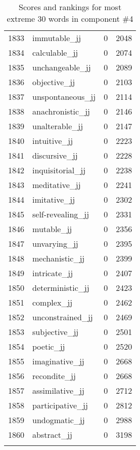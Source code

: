 \begin{longtable}[!htbp]{| rlr@{.}l |}
    1833 & immutable\_jj & 0 & 2048 \\
    1834 & calculable\_jj & 0 & 2074 \\
    1835 & unchangeable\_jj & 0 & 2089 \\
    1836 & objective\_jj & 0 & 2103 \\
    1837 & unspontaneous\_jj & 0 & 2114 \\
    1838 & anachronistic\_jj & 0 & 2146 \\
    1839 & unalterable\_jj & 0 & 2147 \\
    1840 & intuitive\_jj & 0 & 2223 \\
    1841 & discursive\_jj & 0 & 2228 \\
    1842 & inquisitorial\_jj & 0 & 2238 \\
    1843 & meditative\_jj & 0 & 2241 \\
    1844 & imitative\_jj & 0 & 2302 \\
    1845 & self-revealing\_jj & 0 & 2331 \\
    1846 & mutable\_jj & 0 & 2356 \\
    1847 & unvarying\_jj & 0 & 2395 \\
    1848 & mechanistic\_jj & 0 & 2399 \\
    1849 & intricate\_jj & 0 & 2407 \\
    1850 & deterministic\_jj & 0 & 2423 \\
    1851 & complex\_jj & 0 & 2462 \\
    1852 & unconstrained\_jj & 0 & 2469 \\
    1853 & subjective\_jj & 0 & 2501 \\
    1854 & poetic\_jj & 0 & 2520 \\
    1855 & imaginative\_jj & 0 & 2668 \\
    1856 & recondite\_jj & 0 & 2668 \\
    1857 & assimilative\_jj & 0 & 2712 \\
    1858 & participative\_jj & 0 & 2812 \\
    1859 & undogmatic\_jj & 0 & 2988 \\
    1860 & abstract\_jj & 0 & 3198 \\
    \hline
    \caption{Scores and rankings for most extreme 30 words in component \#4} \\
\end{longtable}
